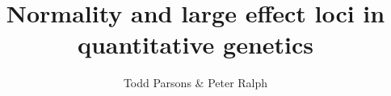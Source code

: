 \documentclass{article}
\theoremstyle{remark}
\theoremstyle{definition}
\begin{document}
% 
% 
% 
% 
% 


\title{\large{\bf
    Normality and large effect loci in quantitative genetics
}}

\author{ \begin{small}
    Todd Parsons \&
    Peter Ralph
\end{small}}
\end{document}
